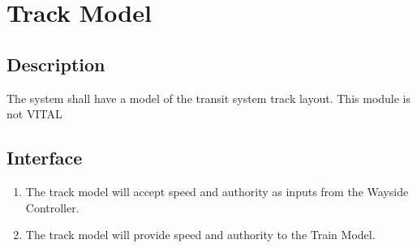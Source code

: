 \documentclass{scrreprt}
\begin{document}
\section{Track Model}

\subsection{Description}
The system shall have a model of the transit system track layout. This module is not VITAL

\subsection{Interface}
\begin{enumerate}
    \item The track model will accept speed and authority as inputs from the Wayside Controller.
    \item The track model will provide speed and authority to the Train Model.
\end{enumerate}
\end{document}
